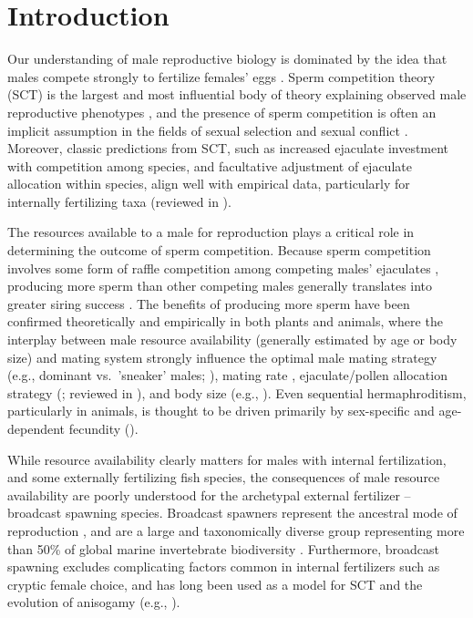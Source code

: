 \documentclass{article}
\begin{document}
\newpage


\section{Introduction}

Our understanding of male reproductive biology is dominated by the idea that males compete strongly to fertilize females' eggs \citep{Bateman1948, Parker1972, Parker1982}. Sperm competition theory (SCT) is the largest and most influential body of theory explaining observed male reproductive phenotypes \citep{Parker1972, Parker1982,Wedell2002}, and the presence of sperm competition is often an implicit assumption in the fields of sexual selection and sexual conflict \citep{BirkheadMoller1998, ArnqvistRowe2005}. Moreover, classic predictions from SCT, such as increased ejaculate investment with competition among species, and facultative adjustment of ejaculate allocation within species, align well with empirical data, particularly for internally fertilizing taxa (reviewed in \citealt{Wedell2002}). 

The resources available to a male for reproduction plays a critical role in determining the outcome of sperm competition. Because sperm competition involves some form of raffle competition among competing males' ejaculates \citep{Wedell2002, ArnqvistRowe2005}, producing more sperm than other competing males generally translates into greater siring success \citep{Parker1972, Parker1982, Wedell2002}. The benefits of producing more sperm have been confirmed theoretically and empirically in both plants and animals, where the interplay between male resource availability (generally estimated by age or body size) and mating system strongly influence the optimal male mating strategy (e.g., dominant vs.~'sneaker' males; \citealt{Parker1990a,Parker1990b,GageEtAl1995}), mating rate \citep{Parker1990b, BirkheadMoller1998, Wedell2002}, ejaculate/pollen allocation strategy (\citealt{FriedmanBarrett2009}; reviewed in \citealt{Wedell2002, Zhang2006}), and body size (e.g., \citealt{ArnoldWade1984}). Even sequential hermaphroditism, particularly in animals, is thought to be driven primarily by sex-specific and age-dependent fecundity (\citealt{Ghiselin1969, Warner1975, Warner1988, MundayWarner2006}).

While resource availability clearly matters for males with internal fertilization, and some externally fertilizing fish species, the consequences of male resource availability are poorly understood for the archetypal external fertilizer -- broadcast spawning species. Broadcast spawners represent the ancestral mode of reproduction \citep{RouFitz1994}, and are a large and taxonomically diverse group representing more than 50\% of global marine invertebrate biodiversity \citep{MonroMarshall2015}. Furthermore, broadcast spawning excludes complicating factors common in internal fertilizers such as cryptic female choice, and has long been used as a model for SCT and the evolution of anisogamy (e.g., \citealt{Parker1972, Parker1982,Parker2017}). 
\end{document}
